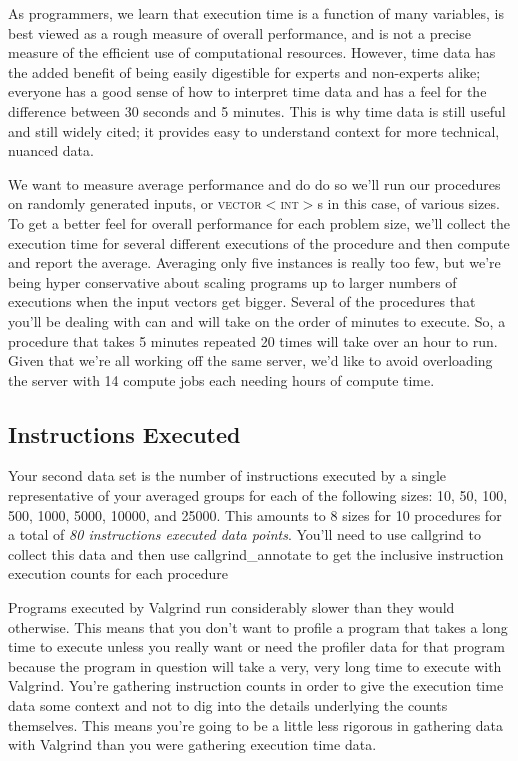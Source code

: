 \documentclass[]{tufte-handout}
\begin{document}
As programmers, we learn that execution time is a function of many variables, is best viewed as a rough measure of overall performance, and is not a precise measure of the efficient use of computational resources.  However, time data has the added benefit of being easily digestible for experts and non-experts alike; everyone has a good sense of how to interpret time data and has a feel for the difference between 30 seconds and 5 minutes. This is why time data is still useful and still widely cited; it provides easy to understand context for more technical, nuanced data.

We want to measure average performance and do do so we'll run our procedures on randomly generated inputs, or \textsc{vector$<$int$>$}s in this case, of various sizes. To get a better feel for overall performance for each problem size, we'll collect the execution time for several different executions of the procedure and then compute and report the average. Averaging only five instances is really too few, but we're being hyper conservative about scaling programs up to larger numbers of executions when the input vectors get bigger. Several of the procedures that you'll be dealing with can and will take on the order of minutes to execute. So, a procedure that takes 5 minutes repeated 20 times will take over an hour to run. Given that we're all working off the same server, we'd like to avoid overloading the server with 14 compute jobs each needing hours of compute time.

\subsection{Instructions Executed}

Your second data set is the number of instructions executed by a single representative of your averaged groups for each of the following sizes: 10, 50, 100, 500, 1000, 5000, 10000, and 25000. This amounts to 8 sizes for 10 procedures for a total of \textit{80 instructions executed data points}.  You'll need to use callgrind to collect this data and then use callgrind\_annotate to get the inclusive instruction execution counts for each procedure

Programs executed by Valgrind run considerably slower than they would otherwise. This means that you don't want to profile a program that takes a long time to execute unless you really want or need the profiler data for that program because the program in question will take a very, very long time to execute with Valgrind. You're gathering instruction counts in order to give the execution time data some context and not to dig into the details underlying the counts themselves. This means you're going to be a little less rigorous in gathering data with Valgrind than you were gathering execution time data.
\end{document}
